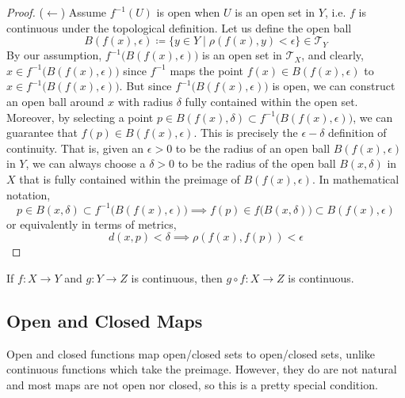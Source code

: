 \begin{proof}
    ($\leftarrow$) Assume $f^{-1}(U)$ is open when $U$ is an open set in $Y$, i.e. $f$ is continuous under the topological definition. Let us define the open ball 
    \begin{equation}
      B(f(x), \epsilon) \coloneqq \{ y \in Y \mid \rho(f(x), y) < \epsilon\} \in \mathscr{T}_Y
    \end{equation}
    By our assumption, $f^{-1} \big( B(f(x), \epsilon) \big)$ is an open set in $\mathscr{T}_X$, and clearly, $x \in f^{-1} \big( B(f(x), \epsilon) \big)$ since $f^{-1}$ maps the point $f(x) \in B(f(x), \epsilon)$ to $x \in f^{-1} \big( B(f(x), \epsilon) \big)$. But since $f^{-1} \big( B(f(x), \epsilon) \big)$ is open, we can construct an open ball around $x$ with radius $\delta$ fully contained within the open set. Moreover, by selecting a point $p \in B(f(x), \delta) \subset f^{-1}\big( B(f(x), \epsilon) \big)$, we can guarantee that $f(p) \in B(f(x), \epsilon)$. This is precisely the $\epsilon - \delta$ definition of continuity. That is, given an $\epsilon > 0$ to be the radius of an open ball $B(f(x), \epsilon)$ in $Y$, we can always choose a $\delta > 0$ to be the radius of the open ball $B(x, \delta)$ in $X$ that is fully contained within the preimage of $B(f(x), \epsilon)$. In mathematical notation, 
    \begin{equation}
      p \in B(x, \delta) \subset f^{-1} \big( B(f(x), \epsilon) \big) \implies f(p) \in f\big( B(x, \delta) \big) \subset B(f(x), \epsilon)
    \end{equation}
    or equivalently in terms of metrics,
    \begin{equation}
      d(x, p) < \delta \implies \rho (f(x), f(p)) < \epsilon
    \end{equation}
  \end{proof} 

  \begin{lemma}
    If $f: X \rightarrow Y$ and $g: Y \rightarrow Z$ is continuous, then $g \circ f :X \rightarrow Z$ is continuous. 
  \end{lemma}

\subsection{Open and Closed Maps}

  Open and closed functions map open/closed sets to open/closed sets, unlike continuous functions which take the preimage. However, they do are not natural and most maps are not open nor closed, so this is a pretty special condition. 

